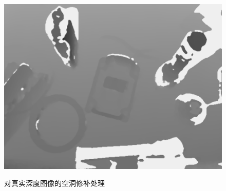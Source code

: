 \begin{figure}[htb]
{		\includegraphics[scale=0.7]{./mypic/空洞修补2.png} 
}
\caption{对真实深度图像的空洞修补处理}
\end{figure}










